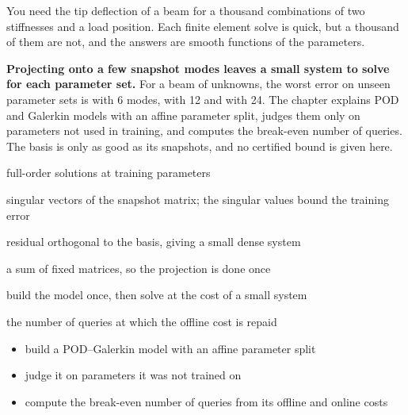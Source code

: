 \newpage\thispagestyle{hl}
\begin{hlquote}You need the tip deflection of a beam for a thousand combinations of two stiffnesses and a load position. Each finite element solve is quick, but a thousand of them are not, and the answers are smooth functions of the parameters.\end{hlquote}
\vspace{8pt}\begin{hlsum}\textbf{Projecting onto a few snapshot modes leaves a small system to solve for each parameter set.} For a beam of \cpdNFree{} unknowns, the worst error on \cpdNTest{} unseen parameter sets is \cpdGalerkinErrSix{} with 6 modes, \cpdGalerkinErrTwelve{} with 12 and \cpdGalerkinErrLast{} with 24. The chapter explains POD and Galerkin models with an affine parameter split, judges them only on parameters not used in training, and computes the break-even number of queries. The basis is only as good as its snapshots, and no certified bound is given here.\end{hlsum}
\begin{description}\setlength\itemsep{5pt}\setlength\parsep{0pt}\renewcommand{\descriptionlabel}[1]{\hspace{\labelsep}\sffamily\bfseries\color{hlnavy}#1}
\item[Snapshots] full-order solutions at training parameters
\item[POD basis] singular vectors of the snapshot matrix; the singular values bound the training error
\item[Galerkin projection] residual orthogonal to the basis, giving a small dense system
\item[Affine parameter dependence] a sum of fixed matrices, so the projection is done once
\item[Offline and online] build the model once, then solve at the cost of a small system
\item[Break-even queries] the number of queries at which the offline cost is repaid
\end{description}
\begin{itemize}\setlength\itemsep{3pt}
\item build a POD--Galerkin model with an affine parameter split
\item judge it on parameters it was not trained on
\item compute the break-even number of queries from its offline and online costs
\end{itemize}
